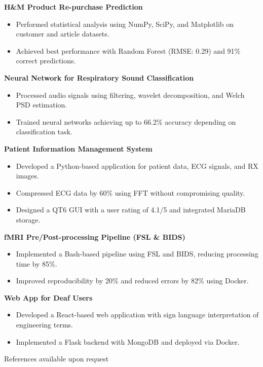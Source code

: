 \documentclass[10pt,a4paper]{article}
\begin{document}
\textbf{H\&M Product Re-purchase Prediction}
\begin{itemize}
    \item Performed statistical analysis using NumPy, SciPy, and Matplotlib on customer and article datasets.
    \item Achieved best performance with Random Forest (RMSE: 0.29) and 91\% correct predictions.
\end{itemize}

\textbf{Neural Network for Respiratory Sound Classification}
\begin{itemize}
    \item Processed audio signals using filtering, wavelet decomposition, and Welch PSD estimation.
    \item Trained neural networks achieving up to 66.2\% accuracy depending on classification task.
\end{itemize}

\textbf{Patient Information Management System}
\begin{itemize}
    \item Developed a Python-based application for patient data, ECG signals, and RX images.
    \item Compressed ECG data by 60\% using FFT without compromising quality.
    \item Designed a QT6 GUI with a user rating of 4.1/5 and integrated MariaDB storage.
\end{itemize}

\textbf{fMRI Pre/Post-processing Pipeline (FSL \& BIDS)}
\begin{itemize}
    \item Implemented a Bash-based pipeline using FSL and BIDS, reducing processing time by 85\%.
    \item Improved reproducibility by 20\% and reduced errors by 82\% using Docker.
\end{itemize}

\textbf{Web App for Deaf Users}
\begin{itemize}
    \item Developed a React-based web application with sign language interpretation of engineering terms.
    \item Implemented a Flask backend with MongoDB and deployed via Docker.
\end{itemize}

\vfill
\begin{center}
References available upon request
\end{center}
\end{document}
